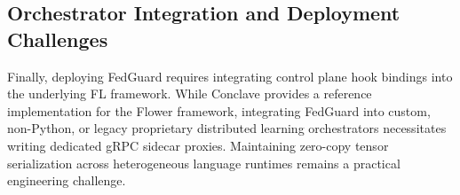 \subsection{Orchestrator Integration and Deployment Challenges}

Finally, deploying FedGuard requires integrating control plane hook bindings into the underlying FL framework. While Conclave provides a reference implementation for the Flower framework, integrating FedGuard into custom, non-Python, or legacy proprietary distributed learning orchestrators necessitates writing dedicated gRPC sidecar proxies. Maintaining zero-copy tensor serialization across heterogeneous language runtimes remains a practical engineering challenge.
